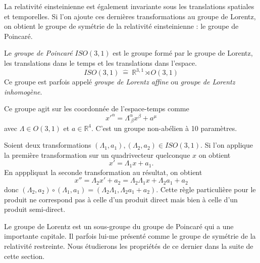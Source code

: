 \documentclass[a4paper,11pt]{report}
\begin{document}
            La relativité einsteinienne est également invariante sous les translations spatiales et temporelles. Si l'on ajoute ces dernières transformations au groupe de Lorentz, on obtient le groupe de symétrie de la relativité einsteinienne : le groupe de Poincaré.
            \begin{definition}
                Le \textit{groupe de Poincaré} $ISO(3,1)$ est le groupe formé par le groupe de Lorentz, les translations dans le temps et les translations dans l'espace.
                \begin{equation}
                    ISO(3,1) ~\hat{=}~ \mathbb{R}^{3,1}\rtimes O(3,1)
                \end{equation}
                Ce groupe est parfois appelé \textit{groupe de Lorentz affine} ou \textit{groupe de Lorentz inhomogène}.
            \end{definition}
            
            Ce groupe agit sur les coordonnée de l'espace-temps comme
            \begin{equation}
                x'^\alpha = \Lambda^\alpha_{~\beta}x^\beta + a^\mu
            \end{equation}
            avec $\Lambda\in O(3,1)$ et $a\in\mathbb{R}^4$. C'est un groupe non-abélien à 10 paramètres.
            
            \begin{rmk}
                Soient deux transformations $(\Lambda_1,a_1),(\Lambda_2,a_2)\in ISO(3,1)$. Si l'on applique la première transformation sur un quadrivecteur quelconque $x$ on obtient
                \begin{equation}
                	x' = \Lambda_1x+a_1.
                \end{equation}
                En apppliquat la seconde transformation au résultat, on obtient
                \begin{equation}
                x'' = \Lambda_2x'+a_2 = \Lambda_2\Lambda_1x+\Lambda_2a_1+a_2
                \end{equation}
                donc $(\Lambda_2,a_2)\circ(\Lambda_1,a_1) = (\Lambda_2\Lambda_1,\Lambda_2a_1+a_2)$. Cette règle particulière pour le produit ne correspond pas à celle d'un produit direct mais bien à celle d'un produit semi-direct.
            \end{rmk}
            
            Le groupe de Lorentz est un sous-groupe du groupe de Poincaré qui a une importante capitale. Il parfois lui-me présenté comme le groupe de symétrie de la relativité restreinte. Nous étudierons les propriétés de ce dernier dans la suite de cette section.
            
\end{document}

